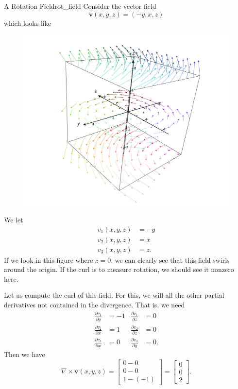         \begin{ex}{A Rotation Field}{rot_field}
        Consider the vector field
        \[
        \mathbf{v}(x,y,z) = (-y,x,z)
        \]
        which looks like
        \begin{figure}[H]
            \centering
            \includegraphics[width=.6\textwidth]{Figures_Part_6/curl_field.png}
        \end{figure}
        We let
        \begin{align*}
            v_1(x,y,z) &= -y\\
            v_2(x,y,z) &= x\\
            v_3(x,y,z) &= z.
        \end{align*}
        If we look in this figure where $z=0$, we can clearly see that this field swirls around the origin.  If the curl is to measure rotation, we should see it nonzero here.
        
        Let us compute the curl of this field.  For this, we will all the other partial derivatives not contained in the divergence. That is, we need
        \begin{align*}
            \frac{\partial v_1}{\partial y} &= -1 & \frac{\partial v_1}{\partial z} &= 0\\
            \frac{\partial v_2}{\partial x} &= 1& \frac{\partial v_2}{\partial z} &= 0\\
            \frac{\partial v_3}{\partial x} &= 0 &  \frac{\partial v_3}{\partial y} &=0.
        \end{align*}
        Then we have
        \[
        \nabla \times \mathbf{v}(x,y,z) = \begin{bmatrix} 0-0\\ 0-0 \\ 1-(-1)\end{bmatrix} = \begin{bmatrix} 0\\ 0 \\ 2\end{bmatrix}.
        \]
        

\end{ex}
